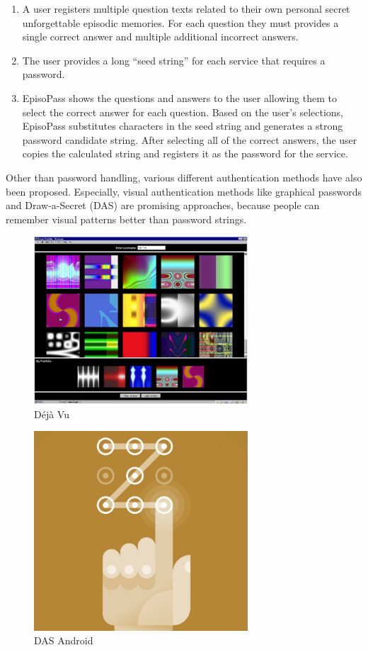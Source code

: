 \documentclass[sigconf]{acmart}
\begin{document}
\begin{enumerate}
\item A user registers multiple question texts related to their own personal
secret unforgettable episodic memories. For each question they must provides
a single correct answer and multiple additional incorrect answers.

\item The user provides a long ``seed string'' for each service that requires
a password.

\item EpisoPass shows the questions and answers to the user allowing
them to select the correct answer for each question.
Based on the user's selections,
EpisoPass substitutes characters in the seed string and generates a
strong password candidate string.
After selecting all of the correct answers,
the user copies the calculated string
and registers it as the password for the service.
\end{enumerate}



Other than password handling,
various different authentication
methods have also been proposed.  Especially, visual authentication methods
like graphical passwords\cite{Biddle:2012:GPL:2333112.2333114,GraphicalPasswords}
and Draw-a-Secret (DAS) \cite{DAS} are promising approaches, because
people can remember visual patterns better than password strings.

\begin{figure}
  \includegraphics[width=8cm,bb=0 0 448 351]{figures/Dejavu.png}
  \caption{D\'{e}j\`{a} Vu}
  \label{fig:sample}
\end{figure}

\begin{figure}
  \includegraphics[width=8cm,bb=0 0 840 792]{figures/DAS.png}
  \caption{DAS Android}
  \label{fig:sample}
\end{figure}
\end{document}
